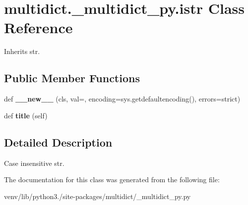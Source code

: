 \hypertarget{classmultidict_1_1__multidict__py_1_1istr}{}\section{multidict.\+\_\+multidict\+\_\+py.\+istr Class Reference}
\label{classmultidict_1_1__multidict__py_1_1istr}


Inherits str.

\subsection*{Public Member Functions}
\begin{DoxyCompactItemize}
\item 
\mbox{\label{classmultidict_1_1__multidict__py_1_1istr_a5942d846124e6517cb28968c9962989c}} 
def {\bfseries \+\_\+\+\_\+new\+\_\+\+\_\+} (cls, val=\textquotesingle{}\textquotesingle{}, encoding=sys.\+getdefaultencoding(), errors=\textquotesingle{}strict\textquotesingle{})
\item 
\mbox{\label{classmultidict_1_1__multidict__py_1_1istr_a48848301025f2d6e6bb05bb011bf3fcc}} 
def {\bfseries title} (self)
\end{DoxyCompactItemize}


\subsection{Detailed Description}
\begin{DoxyVerb}Case insensitive str.\end{DoxyVerb}
 

The documentation for this class was generated from the following file\+:\begin{DoxyCompactItemize}
\item 
venv/lib/python3./site-\/packages/multidict/\+\_\+multidict\+\_\+py.\+py\end{DoxyCompactItemize}
